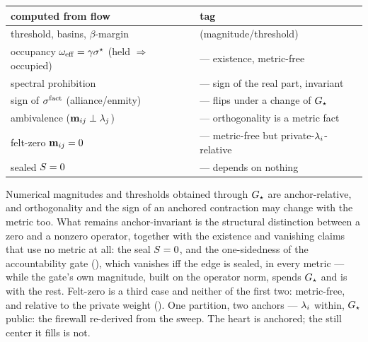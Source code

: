 \documentclass[../main]{subfiles}
\begin{document}
\begin{table}[htbp]
  \centering
  \begin{tabularx}{\textwidth}{@{} L l @{}}
    \toprule
    \textbf{computed from flow} & \textbf{tag} \\
    \midrule
     threshold,  basins,  $\beta$-margin &  (magnitude/threshold) \\
     occupancy $\omega\sb{\mathrm{eff}}=\gamma\sigma\sp{\star}$ (held $\Rightarrow$ occupied) &  --- existence, metric-free \\
     spectral prohibition &  --- sign of the real part, invariant \\
    sign of $\sigma\sp{\mathrm{fact}}$ (alliance/enmity) &  --- flips under a change of $G\sb{\star}$ \\
    ambivalence  ($\mathbf{m}\sb{ ij }\perp\lambda\sb{j}$) &  --- orthogonality is a metric fact \\
    felt-zero $\mathbf{m}\sb{ ij }=0$ &  --- metric-free but private-$\lambda\sb{i}$-relative \\
    sealed $S=0$ &  --- depends on nothing \\
    \bottomrule
  \end{tabularx}
\end{table}

Numerical magnitudes and thresholds obtained through $G\sb{\star}$ are anchor-relative, and
orthogonality and the sign of an anchored contraction may change with the metric too. What
remains anchor-invariant is the structural distinction between a zero and a nonzero operator,
together with the existence and vanishing claims that use no metric at all: the seal
$S=0$, and the one-sidedness of the accountability gate (), which vanishes
iff the edge is sealed, in every metric --- while the gate's own magnitude, built on the
operator norm, spends $G\sb{\star}$ and is  with the rest. Felt-zero is a
third case and neither of the first two: metric-free, and relative to the private weight
(). One partition, two anchors --- $\lambda\sb{i}$
within, $G\sb{\star}$ public: the firewall re-derived from the sweep. The heart is anchored;
the still center it fills is not.

\clearpage
\end{document}
